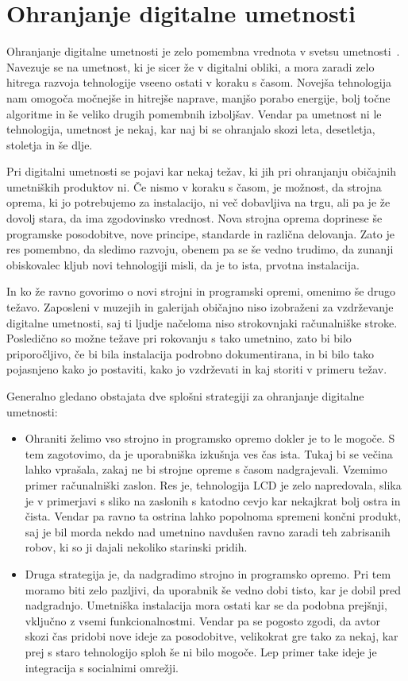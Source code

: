 \chapter{Ohranjanje digitalne umetnosti}
\label{ch:ohranjanjeDigitalneUmetnosti}
Ohranjanje digitalne umetnosti je zelo pomembna vrednota v svetsu
umetnosti~\cite{ZKM}. Navezuje se na umetnost, ki je sicer že v digitalni
obliki, a mora zaradi zelo hitrega razvoja tehnologije vseeno ostati v koraku
s časom. Novejša tehnologija nam omogoča močnejše in hitrejše naprave, manjšo
porabo energije, bolj točne algoritme in še veliko drugih pomembnih izboljšav.
Vendar pa umetnost ni le tehnologija, umetnost je nekaj, kar naj bi se ohranjalo skozi
leta, desetletja, stoletja in še dlje.

Pri digitalni umetnosti se pojavi kar nekaj težav, ki jih pri ohranjanju
običajnih umetniških produktov ni. Če nismo v koraku s časom, je možnost, da
strojna oprema, ki jo potrebujemo za instalacijo, ni več dobavljiva na trgu,
ali pa je že dovolj stara, da ima zgodovinsko vrednost. Nova strojna oprema
doprinese še programske posodobitve, nove principe, standarde in različna
delovanja. Zato je res pomembno, da sledimo razvoju, obenem pa se še vedno
trudimo, da zunanji obiskovalec kljub novi tehnologiji misli, da je to ista,
prvotna instalacija.

In ko že ravno govorimo o novi strojni in programski opremi, omenimo še drugo
težavo. Zaposleni v muzejih in galerijah običajno niso izobraženi za
vzdrževanje digitalne umetnosti, saj ti ljudje načeloma niso strokovnjaki
računalniške stroke. Posledično so možne težave pri rokovanju s tako umetnino,
zato bi bilo priporočljivo, če bi bila instalacija podrobno dokumentirana, in
bi bilo tako pojasnjeno kako jo postaviti, kako jo vzdrževati in kaj storiti v
primeru težav.

Generalno gledano obstajata dve splošni strategiji za ohranjanje digitalne
umetnosti:
\begin{itemize}
\item
Ohraniti želimo vso strojno in programsko
opremo dokler je  to le mogoče. S tem zagotovimo, da je uporabniška izkušnja
ves čas ista. Tukaj bi se večina lahko vprašala, zakaj ne bi strojne opreme s
časom nadgrajevali. Vzemimo primer računalniški zaslon. Res je, tehnologija
LCD je zelo napredovala, slika je v primerjavi s sliko na zaslonih s katodno
cevjo kar nekajkrat bolj ostra in čista. Vendar pa ravno ta ostrina lahko
popolnoma spremeni končni produkt, saj je bil morda nekdo nad umetnino
navdušen ravno zaradi teh zabrisanih robov, ki so ji dajali nekoliko starinski
pridih.

\item
Druga strategija je, da nadgradimo strojno in programsko opremo. Pri tem
moramo biti zelo pazljivi, da uporabnik še vedno dobi tisto, kar je dobil pred
nadgradnjo. Umetniška instalacija mora ostati kar se da podobna prejšnji,
vključno z vsemi funkcionalnostmi. Vendar pa se pogosto zgodi, da avtor skozi
čas pridobi nove ideje za posodobitve, velikokrat gre tako za nekaj, kar prej
s staro tehnologijo sploh še ni bilo mogoče. Lep primer take ideje je
integracija s socialnimi omrežji.
\end{itemize}


